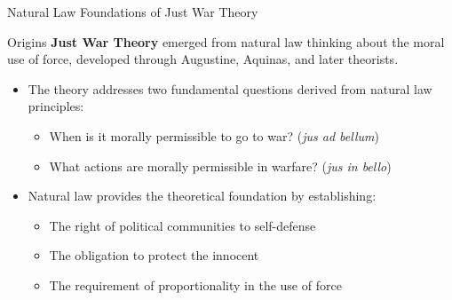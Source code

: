 \documentclass{beamer}
\begin{document}
\begin{frame}{Natural Law Foundations of Just War Theory}
    \begin{alertblock}{Origins}
        \textbf{Just War Theory} emerged from natural law thinking about the moral use of force, developed through Augustine, Aquinas, and later theorists.
    \end{alertblock}

    \begin{itemize}
        \item The theory addresses two fundamental questions derived from natural law principles:
        \begin{itemize}
            \item When is it morally permissible to go to war? (\textit{jus ad bellum})
            \item What actions are morally permissible in warfare? (\textit{jus in bello})
        \end{itemize}
        
        \item Natural law provides the theoretical foundation by establishing:
            \begin{itemize}
                \item The right of political communities to self-defense
                \item The obligation to protect the innocent
                \item The requirement of proportionality in the use of force
            \end{itemize}
    \end{itemize}
\end{frame}
\end{document}
